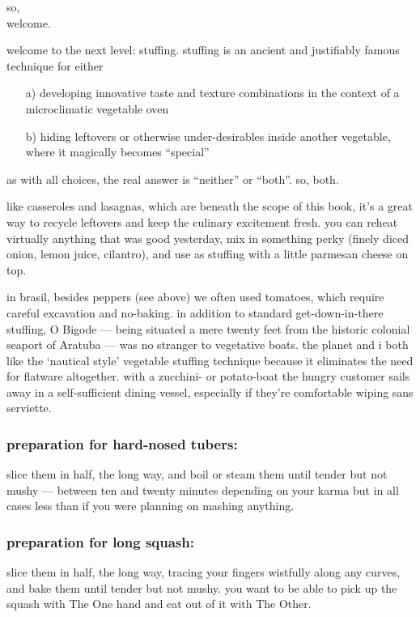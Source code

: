 so,\\
\mbox{\hskip1cm} welcome.

welcome to the next level: stuffing. stuffing is an ancient and justifiably 
famous technique for either

\begin{itemize}
  \item[a)] developing innovative taste and texture combinations in the context 
  of a microclimatic vegetable oven

  \item[b)] hiding leftovers or otherwise under-desirables inside another 
  vegetable, where it magically becomes ``special''
\end{itemize}

as with all choices, the real answer is ``neither'' or ``both''. so, both.

like casseroles and lasagnas, which are beneath the scope of this book, it's a 
great way to recycle leftovers and keep the culinary excitement fresh. you can 
reheat virtually anything that was good yesterday, mix in something perky 
(finely diced onion, lemon juice, cilantro), and use as stuffing with a little 
parmesan cheese on top.

in brasil, besides peppers (see above) we often used tomatoes, which require 
careful excavation and no-baking. in addition to standard get-down-in-there 
stuffing, O Bigode --- being situated a mere twenty feet from the historic 
colonial seaport of Aratuba --- was no stranger to vegetative boats. the 
planet and i both like the `nautical style' vegetable stuffing technique 
because it eliminates the need for flatware altogether. with a zucchini- or 
potato-boat the hungry customer sails away in a self-sufficient dining vessel, 
especially if they're comfortable wiping sans serviette.

\subsubsection{preparation for hard-nosed tubers:}
slice them in half, the long way, and boil or steam them until tender but not 
mushy --- between ten and twenty minutes depending on your karma but in all 
cases less than if you were planning on mashing anything.

\subsubsection{preparation for long squash:}
slice them in half, the long way, tracing your fingers wistfully along any 
curves, and bake them until tender but not mushy. you want to be able to pick 
up the squash with The One hand and eat out of it with The Other.


